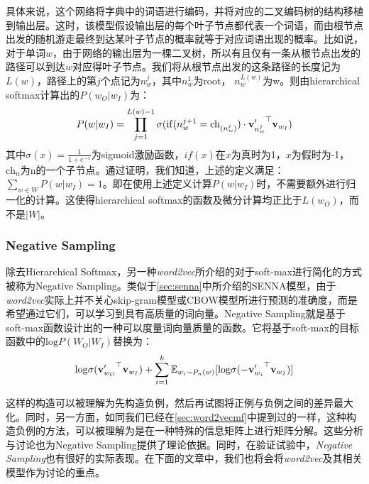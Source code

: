 具体来说，这个网络将字典中的词语进行编码，并将对应的二叉编码树的结构移植到输出层。这时，该模型假设输出层的每个叶子节点都代表一个词语，而由根节点出发的随机游走最终到达某叶子节点的概率就等于对应词语出现的概率。比如说，对于单词$w$，由于网络的输出层为一棵二叉树，所以有且仅有一条从根节点出发的路径可以到达$w$对应得叶子节点。我们将从根节点出发的这条路径的长度记为$L(w)$，路径上的第$j$个点记为$n_w^j$，其中$n_w^1$为root， $n_w^{L(w)}$为w。则由hierarchical softmax计算出的$P(w_O | w_I)$为：
\begin{equation*}
\label{eq:HS}
P(w | w_I) = \prod_{j = 1}^{L(w) - 1} \sigma(\mathrm{if}(n_w^{j+1} = \mathrm{ch}_{(n_w^j)})\cdot {{{\mathbf v}}'_{n_w^j}}^\top {{\mathbf v}}_{w_I})
\end{equation*}
其中$\sigma(x) = \frac{1}{1+e^{-x}}$为sigmoid激励函数，$if(x)$在$x$为真时为1，$x$为假时为-1，$\mathrm{ch}_n$为n的一个子节点。通过证明，我们知道，上述的定义满足：$\sum_{w \in W} P(w | w_I) = 1$。即在使用上述定义计算$P(w | w_I)$时，不需要额外进行归一化的计算。这使得hierarchical softmax的函数及微分计算均正比于$L(w_O)$，而不是$|W|$。

\subsubsection{Negative Sampling}
\label{subsubsec:NS}

除去Hierarchical Softmax，另一种\emph{word2vec}所介绍的对于soft-max进行简化的方式被称为Negative Sampling。类似于\ref{sec:senna}中所介绍的SENNA模型，由于\emph{word2vec}实际上并不关心skip-gram模型或CBOW模型所进行预测的准确度，而是希望通过它们，可以学习到具有高质量的词向量。Negative Sampling就是基于soft-max函数设计出的一种可以度量词向量质量的函数。它将基于soft-max的目标函数中的$\mathrm{log}P(W_{O}|W_{I})$替换为：
\begin{equation*}
\label{eq:NS}
\mathrm{log}\sigma({{{\mathbf v}}'_{w_O}}^\top{{\mathbf v}}_{w_I}) + \sum_{i = 1}^k \mathbb{E}_{w_i \sim P_n(w)}[\mathrm{log}\sigma(-{{{\mathbf v}}'_{w_i}}^\top{{\mathbf v}}_{w_I})]
\end{equation*}

这样的构造可以被理解为先构造负例，然后再试图将正例与负例之间的差异最大化。同时，另一方面，如同我们已经在\ref{sec:word2vecmf}中提到过的一样，这种构造负例的方法，可以被理解为是在一种特殊的信息矩阵上进行矩阵分解。这些分析与讨论也为Negative Sampling提供了理论依据。同时，在验证试验中，\emph{Negative Sampling}也有很好的实际表现。在下面的文章中，我们也将会将\emph{word2vec}及其相关模型作为讨论的重点。